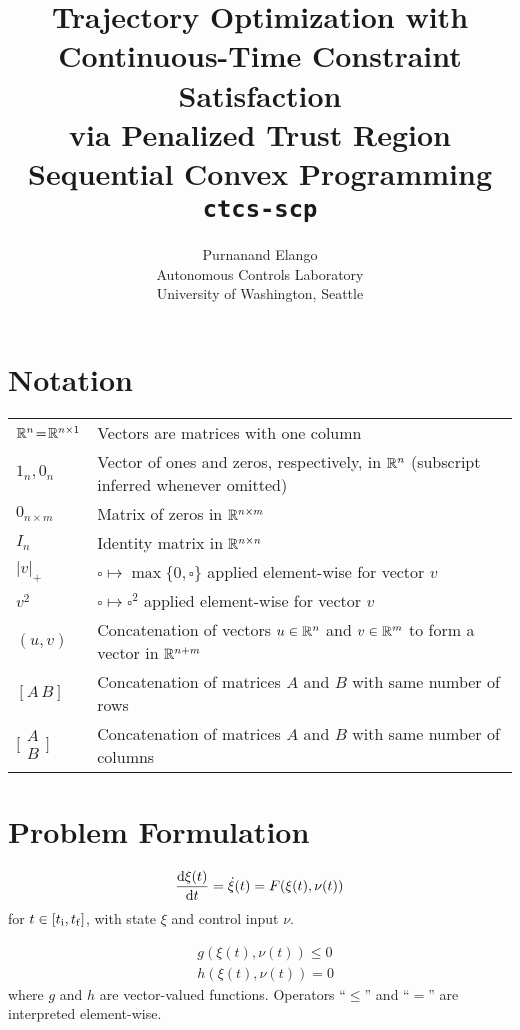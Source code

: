 \documentclass[11pt,a4paper]{article}
\title{{\Large Trajectory Optimization with Continuous-Time Constraint Satisfaction\\via Penalized Trust Region Sequential Convex Programming}\\[0.5cm]{\Large\texttt{ctcs-scp}}}
\author{{\normalsize Purnanand Elango}\\[0.5cm]{\normalsize Autonomous Controls Laboratory}\\{\normalsize University of Washington, Seattle}}
\date{}
\begin{document}
\maketitle

\tableofcontents

\section{Notation}

\begin{tabular}{ll}
$\mathbb{R}^{n}\!=\!\mathbb{R}^{n\times 1}$ & Vectors are matrices with one column\\
$1_n,0_n$   & Vector of ones and zeros, respectively, in $\mathbb{R}^{n}$ (subscript inferred whenever omitted)\\
$0_{n\times m}$ & Matrix of zeros in $\mathbb{R}^{n\times m}$\\
$I_n$   & Identity matrix in $\mathbb{R}^{n\times n}$\\
$|v|_+$ & $\square \mapsto \max\{0,\square\}$ applied element-wise for vector $v$\\
$v^2$   & $\square \mapsto \square^2$ applied element-wise for vector $v$\\
$(u,v)$ & Concatenation of vectors $u\in\mathbb{R}^{n}$ and $v\in\mathbb{R}^{m}$ to form a vector in $\mathbb{R}^{n+m}$\\
$[A\,B]$ & Concatenation of matrices $A$ and $B$ with same number of rows\\
$\bigg[\!\!\!\begin{array}{c}A\\[-0.1cm]B\end{array}\!\!\bigg]$ & Concatenation of matrices $A$ and $B$ with same number of columns\\
\end{tabular}

\section{Problem Formulation}

\begin{align}
    \frac{\mathrm{d}\xi(t)}{\mathrm{d}t} = \dot{\xi}(t) = F(\xi(t),\nu(t))\label{sys-dyn}
\end{align}
for $t\in[t_{\mathrm{i}},t_{\mathrm{f}}]$, with state $\xi$ and control input $\nu$.

\begin{align*}
    & g(\xi(t),\nu(t)) \le 0\\
    & h(\xi(t),\nu(t)) = 0
\end{align*}
where $g$ and $h$ are vector-valued functions. Operators ``$\le$'' and ``$=$'' are interpreted element-wise.
\end{document}
